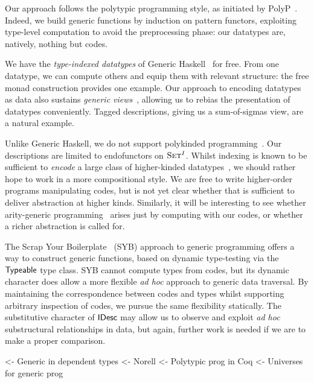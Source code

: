 Our approach follows the polytypic programming style, as initiated
by PolyP~\cite{jansson:polyp}. Indeed, we build generic functions by
induction on pattern functors, exploiting type-level computation
to avoid the preprocessing phase: our
datatypes are, natively, nothing but codes.

We have the \emph{type-indexed datatypes} of Generic
Haskell~\cite{hinze:generic-haskell} for free.
From one datatype, we can compute
others and equip them with relevant structure: the free monad
construction provides one example. Our approach to encoding datatypes
as data also sustains \emph{generic
  views}~\cite{holdermans:generic-view}, allowing us to rebias the
presentation of datatypes conveniently. Tagged descriptions,
giving us a sum-of-sigmas view, are a natural example.

Unlike Generic Haskell, we do not support polykinded
programming~\cite{hinze:polytypic-polykinded}. Our descriptions are
limited to endofunctors on $\Set^I$. Whilst indexing is known
to be sufficient to \emph{encode} a large class of higher-kinded
datatypes~\citep{DBLP:conf/ifip2-1/AltenkirchM02}, we should rather
hope to work in a more compositional style. We are free to write
higher-order programs manipulating codes, but is not yet clear whether
that is sufficient to deliver abstraction at higher kinds.
Similarly, it will be interesting to see whether
arity-generic programming~\cite{weirich:arity-generic} arises
just by computing with our codes, or whether a richer abstraction is
called for.

The Scrap Your Boilerplate~\cite{spj:syb} (SYB) approach to generic
programming offers a way to construct generic functions, based on
dynamic type-testing via the $\textsf{Typeable}$
type class. SYB cannot compute types from codes, but its dynamic character
does allow a more flexible \emph{ad hoc} approach to generic data
traversal. By maintaining the correspondence between codes and types
whilst supporting arbitrary inspection of codes, we pursue the same
flexibility statically. The substitutive character of $\SYMBIDesc$
may allow us to observe and exploit \emph{ad hoc} substructural
relationships in data, but again, further work is needed if we
are to make a proper comparison.

\begin{wstructure}
    <- Generic in dependent types
        <- Norell \cite{norell:msc-thesis}
        <- Polytypic prog in Coq \cite{verbruggen:polytype-coq}
        <- Universes for generic prog \cite{benke:universe-generic-prog}
\end{wstructure}

